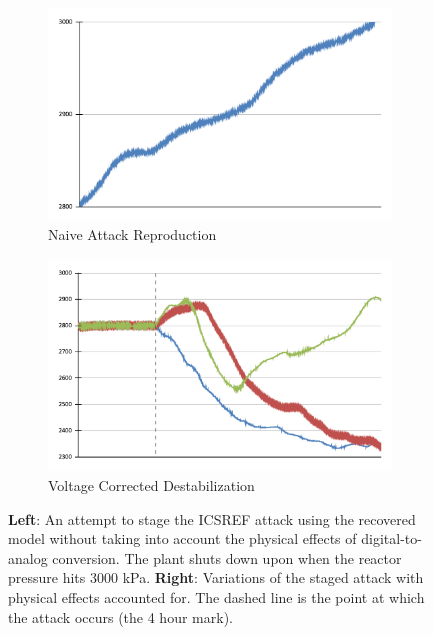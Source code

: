 \begin{figure}
    \centering
    \begin{subfigure}[b]{0.49\textwidth}
        \includegraphics[width=\textwidth]{fig/plc-orig.pdf}
        \caption{Naive Attack Reproduction}
        \label{fig:orig-attack}
    \end{subfigure}
    \hfill
    \begin{subfigure}[b]{0.49\textwidth}
        \includegraphics[width=\textwidth]{fig/dashed-plc.pdf}
	    \caption{Voltage Corrected Destabilization}
        \label{fig:noconv-attack}
    \end{subfigure}
    \hfill
	\caption{\textbf{Left}: An attempt to stage the ICSREF attack using the recovered model without taking into account the physical effects of digital-to-analog conversion. The plant shuts down upon when the reactor pressure hits 3000 kPa. \textbf{Right}: Variations of the staged attack with physical effects accounted for. The dashed line is the point at which the attack occurs (the 4 hour mark).}
    \label{fig:plc-eval}
\end{figure}

